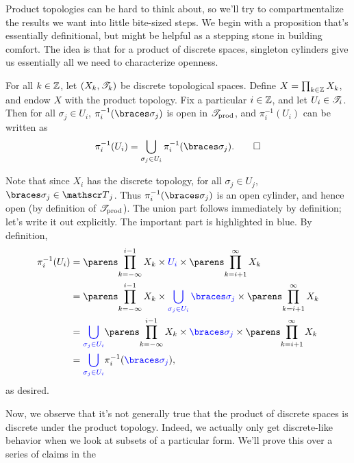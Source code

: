 \documentclass{fkpaper}
\begin{document}
\begin{multicols}{2}
Product topologies can be hard to think about, so we'll try to
compartmentalize the results we want into little bite-sized steps. We
begin with a proposition that's essentially definitional, but might be
helpful as a stepping stone in building comfort. The idea is that for
a product of discrete spaces, singleton cylinders give us essentially
all we need to characterize openness.
\begin{proposition}\label{prop:singleton-cylinder}
  For all $k \in \mathbb{Z}$, let $(X_k, {\mathscr{T}}_k)$ be discrete topological
  spaces. Define $X = \prod_{k\in\mathbb{Z}} X_k$, and endow $X$ with the
  product topology. Fix a particular $i \in \mathbb{Z}$, and let $U_i \in{\mathscr{T}}_i$. Then for all $\sigma_j \in U_i$, $\pi_i^{-1}(\set{\sigma_j})$
  is open in ${\mathscr{T}}_{\rm prod}$, and $\pi_i^{-1}(U_i)$ can be written
  as
  \[
    \pi_i^{-1}(U_i) = \bigcup_{\sigma_j \in U_i}
    \pi_i^{-1}(\set{\sigma_j}). \qedhere
  \]
\end{proposition}
\begin{sproof}
  Note that since $X_i$ has the discrete topology, for all $\sigma_j
  \in U_j$, $\set{\sigma_j} \in \ms T_j$. Thus
  $\pi_i^{-1}(\set{\sigma_j})$ is an open cylinder, and hence open (by
  definition of ${\mathscr{T}}_{\rm prod}$). The union part follows
  immediately by definition; let's write it out explicitly. The
  important part is highlighted in {\color{blue} blue}. By definition,
  \begin{align*}
    \pi_i^{-1}(U_i)
    &= \pn{\prod_{k = -\infty}^{i-1} X_k} \times {\color{blue} U_i}
      \times \pn{\prod_{k=i+1}^\infty X_k} \\
    &= \pn{\prod_{k = -\infty}^{i-1} X_k} \times {\color{blue}
      \bigcup_{\sigma_j \in U_i} \set{\sigma_j}} \times
      \pn{\prod_{k=i+1}^\infty X_k} \\
    &= {\color{blue} \bigcup_{\sigma_j \in U_i}} \pn{\prod_{k =
      -\infty}^{i-1} X_k} \times {\color{blue} \set{\sigma_j}} \times
      \pn{\prod_{k=i+1}^\infty X_k} \\
    &= {\color{blue} \bigcup_{\sigma_j \in U_i}}
      \pi_i^{-1}({\color{blue} \set{\sigma_j}}),
  \end{align*}
  as desired. \qedhere
\end{sproof}
Now, we observe that it's not generally true that the product of
discrete spaces is discrete under the product topology. Indeed, we
actually only get discrete-like behavior when we look at subsets of a
particular form. We'll prove this over a series of claims in the

\end{multicols}
\end{document}
